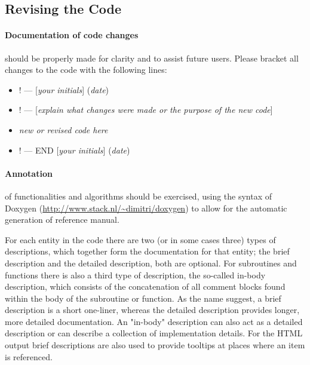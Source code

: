 \documentclass[12pt,letterpaper]{article}
\begin{document}
\newpage

\subsection{Revising the Code}
\paragraph{Documentation of code changes} should be properly made for clarity and to assist future users. Please bracket all changes to the code with the following lines:
\begin{itemize}
\item ! --- [\textit{your initials}] (\textit{date})
\item ! --- [\textit{explain what changes were made or the purpose of the new code}]
\item {\textit{new or revised code here}}
\item ! --- END [\textit{your initials}] (\textit{date})
\end{itemize}

\paragraph{Annotation} of functionalities and algorithms should be exercised, using the syntax of Doxygen (\url{http://www.stack.nl/~dimitri/doxygen}) to allow for the automatic generation of reference manual.

For each entity in the code there are two (or in some cases three) types of descriptions, which together form the documentation for that entity; the brief description and the detailed description, both are optional. For subroutines and functions there is also a third type of description, the so-called in-body description, which consists of the concatenation of all comment blocks found within the body of the subroutine or function. As the name suggest, a brief description is a short one-liner, whereas the detailed description provides longer, more detailed documentation. An "in-body" description can also act as a detailed description or can describe a collection of implementation details. For the HTML output brief descriptions are also used to provide tooltips at places where an item is referenced.
\end{document}
